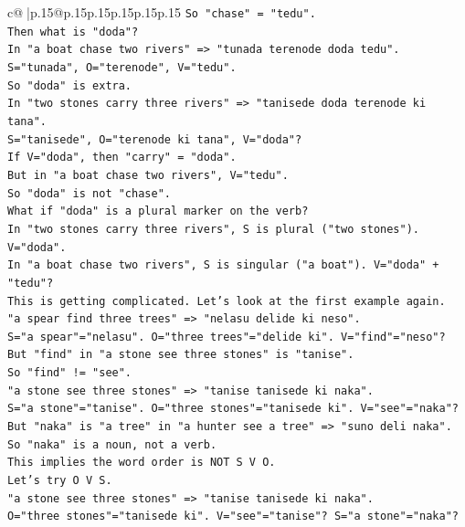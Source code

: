 \documentclass{article}
\begin{document}
{\begin{supertabular}{c@{$\;$}|p{.15\linewidth}@{}p{.15\linewidth}p{.15\linewidth}p{.15\linewidth}p{.15\linewidth}p{.15\linewidth}}
{{{\texttt{So "chase" = "tedu".} \\
\texttt{Then what is "doda"?} \\
\texttt{In "a boat chase two rivers" => "tunada terenode doda tedu".} \\
\texttt{S="tunada", O="terenode", V="tedu".} \\
\texttt{So "doda" is extra.} \\
\texttt{In "two stones carry three rivers" => "tanisede doda terenode ki tana".} \\
\texttt{S="tanisede", O="terenode ki tana", V="doda"?} \\
\texttt{If V="doda", then "carry" = "doda".} \\
\texttt{But in "a boat chase two rivers", V="tedu".} \\
\texttt{So "doda" is not "chase".} \\
\texttt{What if "doda" is a plural marker on the verb?} \\
\texttt{In "two stones carry three rivers", S is plural ("two stones"). V="doda".} \\
\texttt{In "a boat chase two rivers", S is singular ("a boat"). V="doda" + "tedu"?} \\
\texttt{This is getting complicated. Let's look at the first example again.} \\
\texttt{"a spear find three trees" => "nelasu delide ki neso".} \\
\texttt{S="a spear"="nelasu". O="three trees"="delide ki". V="find"="neso"?} \\
\texttt{But "find" in "a stone see three stones" is "tanise".} \\
\texttt{So "find" != "see".} \\
\texttt{"a stone see three stones" => "tanise tanisede ki naka".} \\
\texttt{S="a stone"="tanise". O="three stones"="tanisede ki". V="see"="naka"?} \\
\texttt{But "naka" is "a tree" in "a hunter see a tree" => "suno deli naka".} \\
\texttt{So "naka" is a noun, not a verb.} \\
\texttt{This implies the word order is NOT S V O.} \\
\texttt{Let's try O V S.} \\
\texttt{"a stone see three stones" => "tanise tanisede ki naka".} \\
\texttt{O="three stones"="tanisede ki". V="see"="tanise"? S="a stone"="naka"?} \\
}}}
\end{supertabular}}
\end{document}
